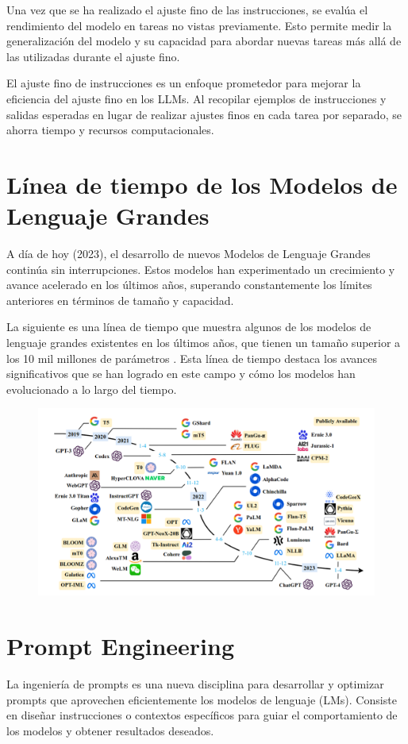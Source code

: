 Una vez que se ha realizado el ajuste fino de las instrucciones, se evalúa el rendimiento del modelo en tareas no vistas previamente. Esto permite medir la generalización del modelo y su capacidad para abordar nuevas tareas más allá de las utilizadas durante el ajuste fino.

El ajuste fino de instrucciones es un enfoque prometedor para mejorar la eficiencia del ajuste fino en los LLMs. Al recopilar ejemplos de instrucciones y salidas esperadas en lugar de realizar ajustes finos en cada tarea por separado, se ahorra tiempo y recursos computacionales.

\section{Línea de tiempo de los Modelos de Lenguaje Grandes}
A día de hoy (2023), el desarrollo de nuevos Modelos de Lenguaje Grandes continúa sin interrupciones. Estos modelos han experimentado un crecimiento y avance acelerado en los últimos años, superando constantemente los límites anteriores en términos de tamaño y capacidad.

La siguiente es una línea de tiempo que muestra algunos de los modelos de lenguaje grandes existentes en los últimos años, que tienen un tamaño superior a los 10 mil millones de parámetros \cite{zhao2023survey}. Esta línea de tiempo destaca los avances significativos que se han logrado en este campo y cómo los modelos han evolucionado a lo largo del tiempo.

\begin{figure}[h]
\includegraphics[scale = 0.33]{pics/llmtimeline.png}
\end{figure}



\section{Prompt Engineering}
La ingeniería de prompts es una nueva disciplina para desarrollar y optimizar prompts que aprovechen eficientemente los modelos de lenguaje (LMs). Consiste en diseñar instrucciones o contextos específicos para guiar el comportamiento de los modelos y obtener resultados deseados.

